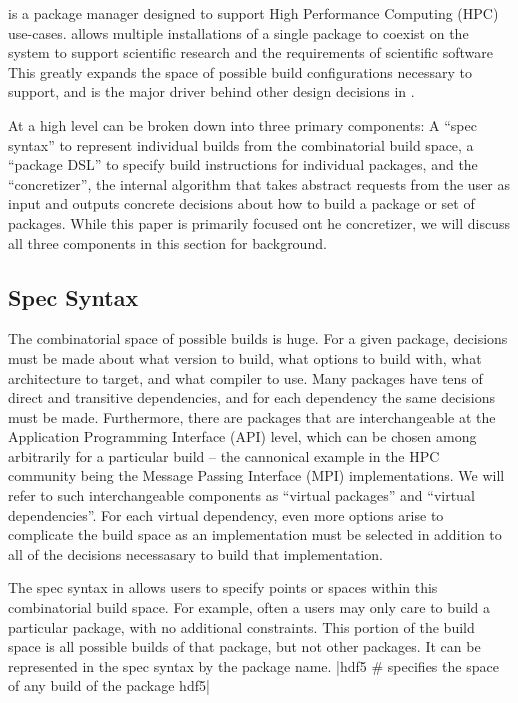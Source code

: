 \spack is a package manager designed to support High Performance Computing (HPC) use-cases.
\spack allows multiple installations of a single package to coexist on the system to support scientific research and the requirements of scientific software
This greatly expands the space of possible build configurations necessary to support, and is the major driver behind other design decisions in \spack.

At a high level \spack can be broken down into three primary components: A ``spec syntax'' to represent individual builds from the combinatorial build space, a ``package DSL'' to specify build instructions for individual packages, and the ``concretizer'', the internal algorithm that takes abstract requests from the user as input and outputs concrete decisions about how to build a package or set of packages.
While this paper is primarily focused ont he concretizer, we will discuss all three components in this section for background.

\subsection{Spec Syntax}

The combinatorial space of possible \spack builds is huge.
For a given package, decisions must be made about what version to build, what options to build with, what architecture to target, and what compiler to use.
Many packages have tens of direct and transitive dependencies, and for each dependency the same decisions must be made.
Furthermore, there are packages that are interchangeable at the Application Programming Interface (API) level, which can be chosen among arbitrarily for a particular build -- the cannonical example in the HPC community being the Message Passing Interface (MPI) implementations.
We will refer to such interchangeable components as ``virtual packages'' and ``virtual dependencies''.
For each virtual dependency, even more options arise to complicate the build space as an implementation must be selected in addition to all of the decisions necessasary to build that implementation.

The spec syntax in \spack allows users to specify points or spaces within this combinatorial build space.
For example, often a users may only care to build a particular package, with no additional constraints.
This portion of the build space is all possible builds of that package, but not other packages.
It can be represented in the spec syntax by the package name.
|hdf5  # specifies the space of any build of the package hdf5|

